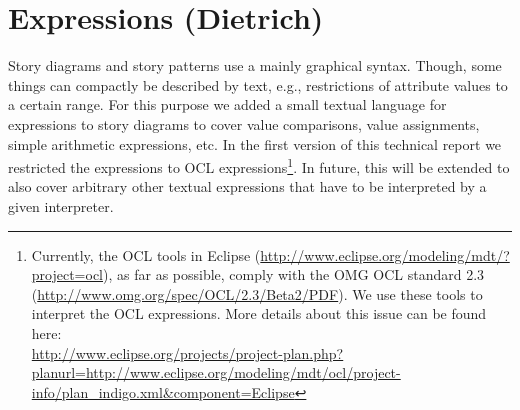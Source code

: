 \section{Expressions (Dietrich)} \label{sec:Expressions}

Story diagrams and story patterns use a mainly graphical syntax.
Though, some things can compactly be described by text, e.g., restrictions of attribute values to a certain range.
For this purpose we added a small textual language for expressions to story diagrams
to cover value comparisons, value assignments, simple arithmetic expressions, etc.
In the first version of this technical report we restricted the expressions to OCL expressions\footnote{Currently,
the OCL tools in Eclipse (\href{http://www.eclipse.org/modeling/mdt/?project=ocl}{http://www.eclipse.org/modeling/mdt/?project=ocl}),
as far as possible, comply with the OMG OCL standard 2.3 (\href{http://www.omg.org/spec/OCL/2.3/Beta2/PDF}{http://www.omg.org/spec/OCL/2.3/Beta2/PDF}).
We use these tools to interpret the OCL expressions.
More details about this issue can be found here:\\ \href{http://www.eclipse.org/projects/project-plan.php?planurl=http://www.eclipse.org/modeling/mdt/ocl/project-info/plan_indigo.xml&component=Eclipse}{http://www.eclipse.org/projects/project-plan.php?planurl=http://www.eclipse.org/modeling/mdt/ocl/project-info/plan\_indigo.xml\&component=Eclipse}}.
In future, this will be extended to also cover arbitrary other textual expressions that have to be interpreted by a given interpreter.